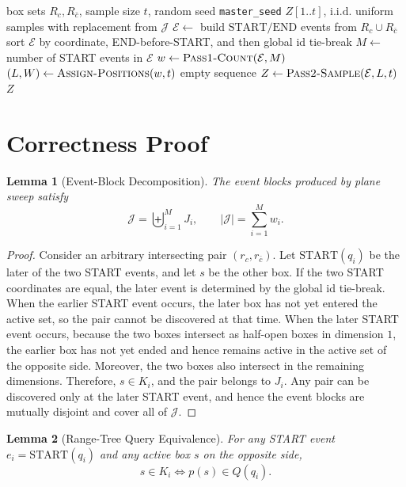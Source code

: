 \documentclass[11pt]{article}
\newtheorem{lemma}{Lemma}[section]
\newcommand{\Rc}{R_c}
\newcommand{\Rbar}{R_{\bar c}}
\newcommand{\Start}{\mathrm{START}}
\newcommand{\End}{\mathrm{END}}
\newcommand{\J}{\mathcal J}
\newcommand{\Ecal}{\mathcal E}
\newcommand{\iid}{\mathrm{i.i.d.}}
\begin{document}
\begin{algorithm}[t]
\caption{SweepRT: Two-Pass Count/Sample}
\label{alg:sweeprt}
\begin{algorithmic}[1]
\Require box sets $\Rc,\Rbar$, sample size $t$, random seed \texttt{master\_seed}
\Ensure $Z[1..t]$, \(\iid\) uniform samples with replacement from $\J$
\State $\Ecal\gets$ build $\Start/\End$ events from $\Rc\cup\Rbar$
\State sort $\Ecal$ by coordinate, END-before-START, and then global id tie-break
\State $M\gets$ number of START events in $\Ecal$
\State $w\gets\Call{Pass1-Count}{\Ecal,M}$
\State $(L,W)\gets\Call{Assign-Positions}{w,t}$
    \State \Return empty sequence
\EndIf
\State $Z\gets\Call{Pass2-Sample}{\Ecal,L,t}$
\State \Return $Z$
\end{algorithmic}
\end{algorithm}

\section{Correctness Proof}

\begin{lemma}[Event-Block Decomposition]
The event blocks produced by plane sweep satisfy
\[
 \J=\biguplus_{i=1}^{M}J_i,
 \qquad
 |\J|=\sum_{i=1}^{M}w_i.
\]
\end{lemma}

\begin{proof}
Consider an arbitrary intersecting pair \((r_c,r_{\bar c})\). Let \(\Start(q_i)\) be the later of the two START events, and let \(s\) be the other box. If the two START coordinates are equal, the later event is determined by the global id tie-break. When the earlier START event occurs, the later box has not yet entered the active set, so the pair cannot be discovered at that time. When the later START event occurs, because the two boxes intersect as half-open boxes in dimension \(1\), the earlier box has not yet ended and hence remains active in the active set of the opposite side. Moreover, the two boxes also intersect in the remaining dimensions. Therefore, \(s\in K_i\), and the pair belongs to \(J_i\). Any pair can be discovered only at the later START event, and hence the event blocks are mutually disjoint and cover all of \(\J\).
\end{proof}

\begin{lemma}[Range-Tree Query Equivalence]
For any START event \(e_i=\Start(q_i)\) and any active box \(s\) on the opposite side,
\[
 s\in K_i \iff p(s)\in Q(q_i).
\]
\end{lemma}
\end{document}
